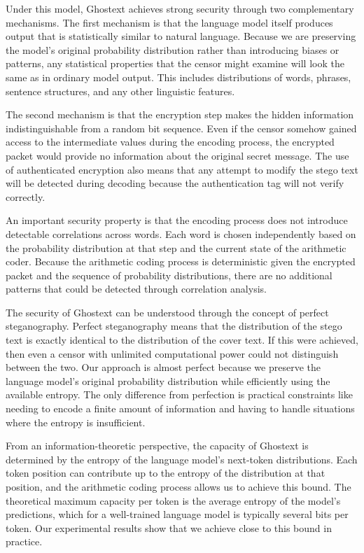 \documentclass[sigconf,review,anonymous]{acmart}
\begin{document}
Under this model, Ghostext achieves strong security through two complementary mechanisms. The first mechanism is that the language model itself produces output that is statistically similar to natural language. Because we are preserving the model's original probability distribution rather than introducing biases or patterns, any statistical properties that the censor might examine will look the same as in ordinary model output. This includes distributions of words, phrases, sentence structures, and any other linguistic features.

The second mechanism is that the encryption step makes the hidden information indistinguishable from a random bit sequence. Even if the censor somehow gained access to the intermediate values during the encoding process, the encrypted packet would provide no information about the original secret message. The use of authenticated encryption also means that any attempt to modify the stego text will be detected during decoding because the authentication tag will not verify correctly.

An important security property is that the encoding process does not introduce detectable correlations across words. Each word is chosen independently based on the probability distribution at that step and the current state of the arithmetic coder. Because the arithmetic coding process is deterministic given the encrypted packet and the sequence of probability distributions, there are no additional patterns that could be detected through correlation analysis.

The security of Ghostext can be understood through the concept of perfect steganography. Perfect steganography means that the distribution of the stego text is exactly identical to the distribution of the cover text. If this were achieved, then even a censor with unlimited computational power could not distinguish between the two. Our approach is almost perfect because we preserve the language model's original probability distribution while efficiently using the available entropy. The only difference from perfection is practical constraints like needing to encode a finite amount of information and having to handle situations where the entropy is insufficient.

From an information-theoretic perspective, the capacity of Ghostext is determined by the entropy of the language model's next-token distributions. Each token position can contribute up to the entropy of the distribution at that position, and the arithmetic coding process allows us to achieve this bound. The theoretical maximum capacity per token is the average entropy of the model's predictions, which for a well-trained language model is typically several bits per token. Our experimental results show that we achieve close to this bound in practice.
\end{document}
